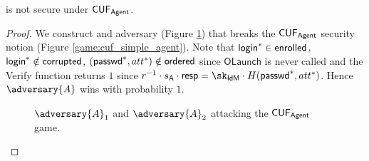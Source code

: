 \begin{theorem}
    \construction is not secure under $\mathsf{CUF}_{\textsf{Agent}}$. 
\end{theorem}

\begin{proof}
    We construct and adversary  (Figure \ref{game:cuf_agent_attack}) that breaks the $\mathsf{CUF}_{\textsf{Agent}}$ security notion (Figure \ref{game:cuf_simple_agent}). Note that $\mathsf{login}^* \in \mathsf{enrolled}$, $\mathsf{login}^* \notin \mathsf{corrupted}$, $(\textsf{passwd}^*, att^*) \notin \mathsf{ordered}$ since $\mathsf{OLaunch}$ is never called and the Verify function returns $1$ since $r^{-1}\cdot \agentsecret\cdot \response = \sk_\idm\cdot H(\pseudo^*, att^*)$. Hence $\adversary{A}$ wins with probability $1$. 

    \begin{figure*}
\begin{pchstack}[center, space=0.2cm, boxed]
\end{pchstack}
\caption{$\adversary{A}_1$ and $\adversary{A}_2$ attacking the $\mathsf{CUF}_{\textsf{Agent}}$ game.}
\label{game:cuf_agent_attack}
\end{figure*}
\end{proof}



